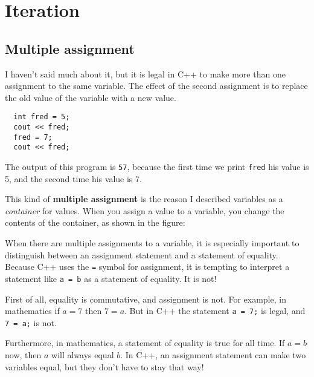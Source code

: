 


\chapter{Iteration}

\section{Multiple assignment}

I haven't said much about it, but it is legal in C++ to
make more than one assignment to the same variable.  The
effect of the second assignment is to replace the old value
of the variable with a new value.

\begin{lstlisting}
  int fred = 5;
  cout << fred;
  fred = 7;
  cout << fred;
\end{lstlisting}
%
The output of this program is {\tt 57}, because the first
time we print {\tt fred} his value is 5, and the second time
his value is 7.

This kind of {\bf multiple assignment} is the reason I
described variables as a {\em container} for values.  When
you assign a value to a variable, you change the contents of
the container, as shown in the figure:

\vspace{0.1in}
\centerline{}
\vspace{0.1in}

When there are multiple assignments to a variable, it is especially
important to distinguish between an assignment statement and a
statement of equality.  Because C++ uses the {\tt =} symbol for
assignment, it is tempting to interpret a statement like {\tt a = b}
as a statement of equality.  It is not!

First of all, equality is commutative, and assignment is not.
For example, in mathematics if $a = 7$ then $7 = a$.  But in
C++ the statement {\tt a = 7;} is legal, and {\tt 7 = a;}
is not.

Furthermore, in mathematics, a statement of equality is true
for all time.  If $a = b$ now, then $a$ will always equal $b$.
In C++, an assignment statement can make two variables equal,
but they don't have to stay that way!

